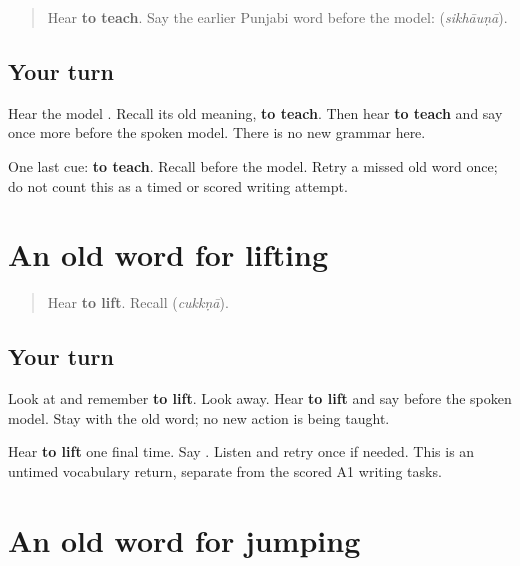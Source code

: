 \label{lesson:PA-R160-teach-again}



\begin{quote}
Hear \textbf{to teach}. Say the earlier Punjabi word before the model: \textbf{} (\emph{sikhāuṇā}).
\end{quote}

\subsection*{Your turn}
Hear the model \textbf{}. Recall its old meaning, \textbf{to teach}. Then hear \textbf{to teach} and say \textbf{} once more before the spoken model. There is no new grammar here.

\begin{tcolorbox}[breakable,colback=teal!4,colframe=teal!35!black,title={Before you move on}]
One last cue: \textbf{to teach}. Recall \textbf{} before the model. Retry a missed old word once; do not count this as a timed or scored writing attempt.
\end{tcolorbox}
\section[\texorpdfstring{\pa{ਚੁੱਕਣਾ} (cukkṇā)}{ਚੁੱਕਣਾ (cukkṇā)}]{An old word for lifting}

\label{lesson:PA-R160-lift-again}



\begin{quote}
Hear \textbf{to lift}. Recall \textbf{} (\emph{cukkṇā}).
\end{quote}

\subsection*{Your turn}
Look at \textbf{} and remember \textbf{to lift}. Look away. Hear \textbf{to lift} and say \textbf{} before the spoken model. Stay with the old word; no new action is being taught.

\begin{tcolorbox}[breakable,colback=teal!4,colframe=teal!35!black,title={Before you move on}]
Hear \textbf{to lift} one final time. Say \textbf{}. Listen and retry once if needed. This is an untimed vocabulary return, separate from the scored A1 writing tasks.
\end{tcolorbox}
\section[\texorpdfstring{\pa{ਟੱਪਣਾ} (ṭappṇā)}{ਟੱਪਣਾ (ṭappṇā)}]{An old word for jumping}

